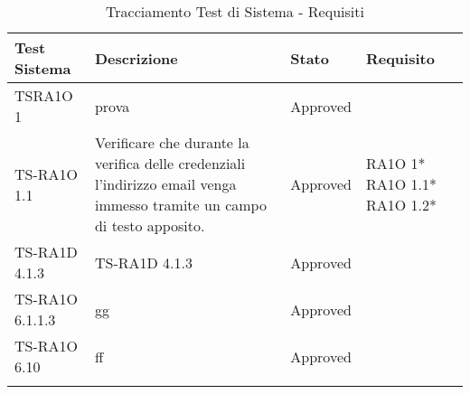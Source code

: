 

	\begin{center}
	\def\arraystretch{1.5}
	\bgroup
		\begin{longtable}{| p{3cm} | p{6cm} | p{1.5cm} | p{2cm} | }
		\hline 
		 \textbf{Test Sistema} & \textbf{Descrizione} & \textbf{Stato} & \textbf{Requisito} \\ \hline
				TSRA1O 1 & 
				prova & Approved & \\ \hline 
				TS-RA1O 1.1 & 
				Verificare che durante la verifica delle credenziali l'indirizzo email venga immesso tramite un campo di testo apposito. & Approved & RA1O 1*  \newline  RA1O 1.1*  \newline  RA1O 1.2*  \newline  \\ \hline 
				TS-RA1D 4.1.3 & 
				TS-RA1D 4.1.3 & Approved & \\ \hline 
				TS-RA1O 6.1.1.3 & 
				gg & Approved & \\ \hline 
				TS-RA1O 6.10 & 
				ff & Approved & \\ \hline 
		\caption{Tracciamento Test di Sistema - Requisiti}
		\end{longtable}
	 \egroup
\end{center}